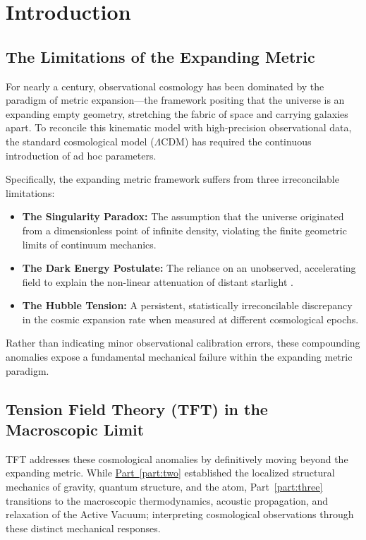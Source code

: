 \chapter{Introduction}
\label{chap:part3_intro}

\section{The Limitations of the Expanding Metric}

For nearly a century, observational cosmology has been dominated by the paradigm of metric expansion---the framework positing that the universe is an expanding empty geometry, stretching the fabric of space and carrying galaxies apart. To reconcile this kinematic model with high-precision observational data, the standard cosmological model ($\Lambda$CDM) has required the continuous introduction of ad hoc parameters.

Specifically, the expanding metric framework suffers from three irreconcilable limitations:
\begin{itemize}
    \item \textbf{The Singularity Paradox:} The assumption that the universe originated from a dimensionless point of infinite density, violating the finite geometric limits of continuum mechanics.
    \item \textbf{The Dark Energy Postulate:} The reliance on an unobserved, accelerating field to explain the non-linear attenuation of distant starlight \cite{Riess_1998}.
    \item \textbf{The Hubble Tension:} A persistent, statistically irreconcilable discrepancy in the cosmic expansion rate when measured at different cosmological epochs.
\end{itemize}

Rather than indicating minor observational calibration errors, these compounding anomalies expose a fundamental mechanical failure within the expanding metric paradigm.

\section{Tension Field Theory (TFT) in the Macroscopic Limit}

TFT addresses these cosmological anomalies by definitively moving beyond the expanding metric. While \hyperref[part:two]{Part~\ref{part:two}} established the localized structural mechanics of gravity, quantum structure, and the atom, Part~\ref{part:three} transitions to the macroscopic thermodynamics, acoustic propagation, and relaxation of the Active Vacuum; interpreting cosmological observations through these distinct mechanical responses.

